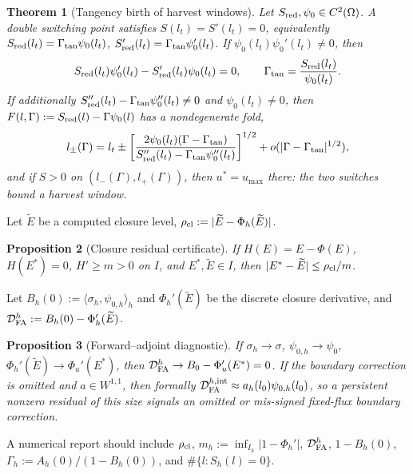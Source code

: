 \documentclass[a4paper,fleqn,longmktitle]{cas-sc}
\theoremstyle{plain}
\newtheorem{theorem}{Theorem}[section]
\newtheorem{proposition}[theorem]{Proposition}
\theoremstyle{definition}
\theoremstyle{remark}
\numberwithin{equation}{section}
\begin{document}
\begin{theorem}[Tangency birth of harvest windows]
\label{thm:main_tangency}
Let \(S_{\rm red},\psi_0\in C^2(\Omega)\). A double switching point satisfies
\(S(l_t)=S'(l_t)=0\), equivalently
\(S_{\rm red}(l_t)=\Gamma_{\rm tan}\psi_0(l_t)\),
\(S_{\rm red}'(l_t)=\Gamma_{\rm tan}\psi_0'(l_t)\). If
\(\psi_0(l_t)\psi_0'(l_t)\ne0\), then
\begin{equation}
    \label{eq:main_tangency_eliminated}
    S_{\rm red}(l_t)\psi_0'(l_t)
    -
    S_{\rm red}'(l_t)\psi_0(l_t)=0,
    \qquad
    \Gamma_{\rm tan}
    =
    \frac{S_{\rm red}(l_t)}{\psi_0(l_t)}.
\end{equation}
If additionally \(S_{\rm red}''(l_t)-\Gamma_{\rm tan}\psi_0''(l_t)\ne0\) and
\(\psi_0(l_t)\ne0\), then \(F(l,\Gamma):=S_{\rm red}(l)-\Gamma\psi_0(l)\) has a
nondegenerate fold,
\begin{equation}
    \label{eq:main_tangency_branches}
    l_\pm(\Gamma)
    =
    l_t
    \pm
    \left[
        \frac{2\psi_0(l_t)(\Gamma-\Gamma_{\rm tan})}
        {S_{\rm red}''(l_t)-\Gamma_{\rm tan}\psi_0''(l_t)}
    \right]^{1/2}
    +
    o(|\Gamma-\Gamma_{\rm tan}|^{1/2}),
\end{equation}
and if \(S>0\) on \((l_-(\Gamma),l_+(\Gamma))\), then \(u^*=u_{\max}\) there:
the two switches bound a harvest window.
\end{theorem}

Let \(\widetilde E\) be a computed closure level,
\(\rho_{\rm cl}:=|\widetilde E-\Phi_h(\widetilde E)|\).
\begin{proposition}[Closure residual certificate]
\label{prop:main_closure_certificate}
If \(H(E)=E-\Phi(E)\), \(H(E^*)=0\), \(H'\ge m>0\) on \(I\), and
\(E^*,\widetilde E\in I\), then \(|E^*-\widetilde E|\le\rho_{\rm cl}/m\).
\end{proposition}
Let \(B_h(0):=\langle\sigma_h,\psi_{0,h}\rangle_h\) and \(\Phi_h'(\widetilde E)\)
be the discrete closure derivative, and
\(\mathcal D_{\rm FA}^h:=B_h(0)-\Phi_h'(\widetilde E)\).
\begin{proposition}[Forward--adjoint diagnostic]
\label{prop:main_FA_diagnostic}
If \(\sigma_h\to\sigma\), \(\psi_{0,h}\to\psi_0\),
\(\Phi_h'(\widetilde E)\to\Phi_u'(E^*)\), then
\(\mathcal D_{\rm FA}^h\to B_0-\Phi_u'(E^*)=0\). If the boundary correction is
omitted and \(a\in W^{1,1}\), then formally
\(\mathcal D_{\rm FA}^{h,\rm int}\approx a_h(l_0)\psi_{0,h}(l_0)\), so a
persistent nonzero residual of this size signals an omitted or mis-signed
fixed-flux boundary correction.
\end{proposition}
A numerical report should include \(\rho_{\rm cl}\),
\(m_h:=\inf_{I_h}|1-\Phi_h'|\), \(\mathcal D_{\rm FA}^h\), \(1-B_h(0)\),
\(\Gamma_h:=A_h(0)/(1-B_h(0))\), and \(\#\{l:S_h(l)=0\}\).
\end{document}
